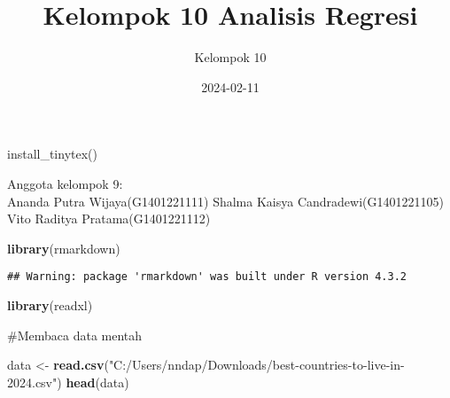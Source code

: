 \documentclass[
]{article}
\title{Kelompok 10 Analisis Regresi}
\author{Kelompok 10}
\date{2024-02-11}
\newenvironment{Shaded}{\begin{snugshade}}{\end{snugshade}}
\newcommand{\FunctionTok}[1]{\textcolor[rgb]{0.13,0.29,0.53}{\textbf{#1}}}
\newcommand{\NormalTok}[1]{#1}
\newcommand{\OtherTok}[1]{\textcolor[rgb]{0.56,0.35,0.01}{#1}}
\newcommand{\StringTok}[1]{\textcolor[rgb]{0.31,0.60,0.02}{#1}}
\begin{document}
\maketitle

install\_tinytex()

Anggota kelompok 9:\\
Ananda Putra Wijaya(G1401221111) Shalma Kaisya Candradewi(G1401221105)
Vito Raditya Pratama(G1401221112)

\begin{Shaded}
\begin{Highlighting}[]
\FunctionTok{library}\NormalTok{(rmarkdown)}
\end{Highlighting}
\end{Shaded}

\begin{verbatim}
## Warning: package 'rmarkdown' was built under R version 4.3.2
\end{verbatim}

\begin{Shaded}
\begin{Highlighting}[]
\FunctionTok{library}\NormalTok{(readxl)}
\end{Highlighting}
\end{Shaded}

\#Membaca data mentah

\begin{Shaded}
\begin{Highlighting}[]
\NormalTok{data }\OtherTok{\textless{}{-}} \FunctionTok{read.csv}\NormalTok{(}\StringTok{"C:/Users/nndap/Downloads/best{-}countries{-}to{-}live{-}in{-}2024.csv"}\NormalTok{)}
\FunctionTok{head}\NormalTok{(data)}
\end{Highlighting}
\end{Shaded}
\end{document}

